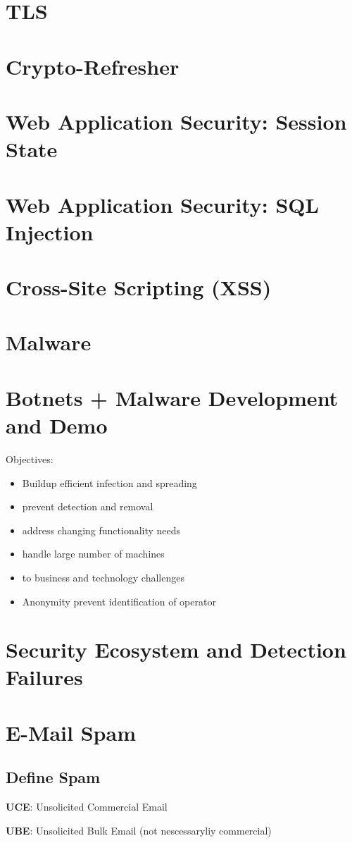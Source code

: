 \documentclass[fs, footer]{latex4ei}
\begin{document}
\begin{multicols*}{4}

\section{TLS}

\section{Crypto-Refresher}

\section{Web Application Security: Session State}

\section{Web Application Security: SQL Injection}

\section{Cross-Site Scripting (XSS)}


\section{Malware}

\section{Botnets + Malware Development and Demo}
Objectives:
	\begin{itemize}
		\item Buildup efficient infection and spreading
		\item prevent detection and removal
		\item address changing functionality needs
		\item handle large number of machines
		\item to business and technology challenges
		\item Anonymity prevent identification of operator
	\end{itemize}

\section{Security Ecosystem and Detection Failures}

\section{E-Mail Spam}
\subsection{Define Spam}
\textbf{UCE}: Unsolicited Commercial Email

\textbf{UBE}: Unsolicited Bulk Email (not nescessaryliy commercial)
\end{multicols*}

\end{document}
